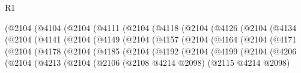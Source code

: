 \begin{lexlean}{R1}
\begin{coremodule}
                    (@2104
                      (@4104
                        (@2104
                          (@4111
                            (@2104
                              (@4118
                                (@2104
                                  (@4126
                                    (@2104
                                      (@4134
                                        (@2104
                                          (@4141
                                            (@2104
                                              (@4149
                                                (@2104
                                                  (@4157
                                                    (@2104
                                                      (@4164
                                                        (@2104
                                                          (@4171
                                                            (@2104
                                                              (@4178
                                                                (@2104
                                                                  (@4185
                                                                    (@2104
                                                                      (@4192
                                                                        (@2104
                                                                          (@4199
                                                                            (@2104
                                                                              (@4206
                                                                                (@2104
                                                                                  (@4213
                                                                                    (@2104
                                                                                      (@2106
                                                                                        (@2108
                                                                                          @4214
                                                                                          @2098)
                                                                                        (@2115
                                                                                          @4214
                                                                                          @2098)

\end{coremodule}
\end{lexlean}
